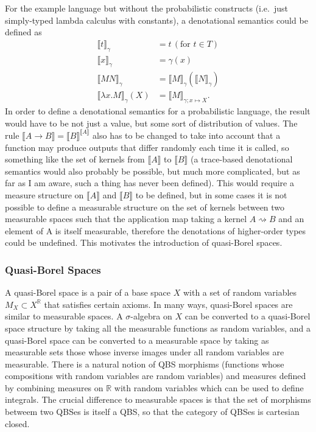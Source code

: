 \documentclass[titlepage]{article}
\newcommand{\denotation}[1]{\llbracket #1 \rrbracket}
\begin{document}
For the example language but without the probabilistic constructs (i.e.~just simply-typed lambda calculus with constants), a denotational semantics could be defined as
\begin{align*}
\denotation t_\gamma & = t\,(\text{for }t \in T) \\
\denotation x_\gamma & = \gamma(x) \\
\denotation{M N}_\gamma & = \denotation M_\gamma(\denotation N_\gamma) \\
\denotation{\lambda x. M }_\gamma(X) & = \denotation M_{\gamma ; x \mapsto X}.
\end{align*}
In order to define a denotational semantics for a probabilistic language, the result would have to be not just a value, but some sort of distribution of values. The rule $\denotation{A \to B} = \denotation B^{\denotation A}$ also has to be changed to take into account that a function may produce outputs that differ randomly each time it is called, so something like the set of kernels from $\denotation A$ to $\denotation B$ (a trace-based denotational semantics would also probably be possible, but much more complicated, but as far as I am aware, such a thing has never been defined). This would require a measure structure on $\denotation A$ and $\denotation B$ to be defined, but in some cases it is not possible to define a measurable structure on the set of kernels between two measurable spaces such that the application map taking a kernel $A \rightsquigarrow B$ and an element of A is itself measurable, therefore the denotations of higher-order types could be undefined. This motivates the introduction of quasi-Borel spaces.\cite{8005137}

\subsubsection{Quasi-Borel Spaces}
A quasi-Borel space is a pair of a base space $X$ with a set of random variables $M_X \subset X^{\mathbb R}$ that satisfies certain axioms. In many ways, quasi-Borel spaces are similar to measurable spaces. A $\sigma$-algebra on $X$ can be converted to a quasi-Borel space structure by taking all the measurable functions as random variables, and a quasi-Borel space can be converted to a measurable space by taking as measurable sets those whose inverse images under all random variables are measurable. There is a natural notion of QBS morphisms (functions whose compositions with random variables are random variables) and measures defined by combining measures on $\mathbb R$ with random variables which can be used to define integrals. The crucial difference to measurable spaces is that the set of morphisms betweem two QBSes is itself a QBS, so that the category of QBSes is cartesian closed.
\end{document}
